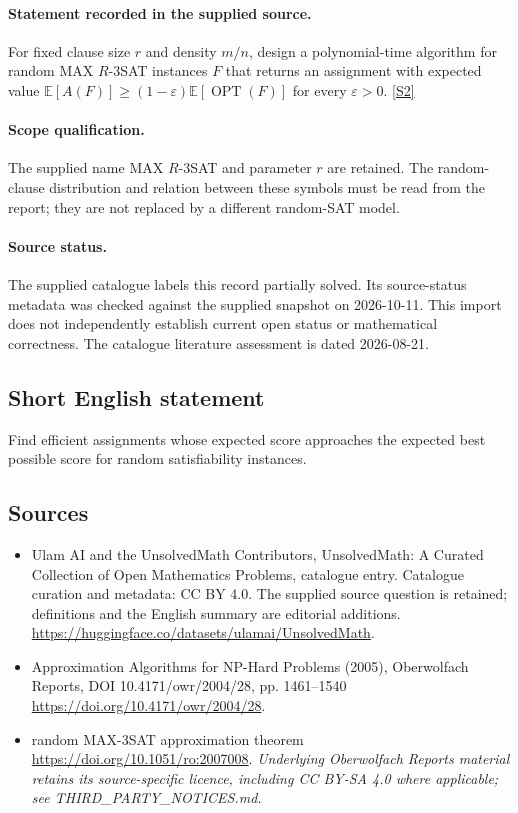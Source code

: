 \documentclass[11pt]{article}
\begin{document}
\paragraph{Statement recorded in the supplied source.}
For fixed clause size $r$ and density $m/n$, design a polynomial-time algorithm for random MAX $R$-3SAT instances $F$ that returns an assignment with expected value $\mathbb{E}[A(F)]\geq(1-\varepsilon)\mathbb{E}[\operatorname{OPT}(F)]$ for every $\varepsilon>0$. \href{https://doi.org/10.4171/owr/2004/28}{[S2]}
\paragraph{Scope qualification.}
The supplied name MAX $R$-3SAT and parameter $r$ are retained. The random-clause distribution and relation between these symbols must be read from the report; they are not replaced by a different random-SAT model.
\paragraph{Source status.}
The supplied catalogue labels this record partially solved. Its source-status metadata was checked against the supplied snapshot on 2026-10-11. This import does not independently establish current open status or mathematical correctness. The catalogue literature assessment is dated 2026-08-21.
\subsection{Short English statement}
Find efficient assignments whose expected score approaches the expected best possible score for random satisfiability instances.
\subsection{Sources}
\begin{itemize}
\item[S1] Ulam AI and the UnsolvedMath Contributors, UnsolvedMath: A Curated Collection of Open Mathematics Problems, catalogue entry. Catalogue curation and metadata: CC BY 4.0. The supplied source question is retained; definitions and the English summary are editorial additions.
\url{https://huggingface.co/datasets/ulamai/UnsolvedMath}.
\item[S2] Approximation Algorithms for NP-Hard Problems (2005), Oberwolfach Reports, DOI 10.4171/owr/2004/28, pp. 1461--1540
\url{https://doi.org/10.4171/owr/2004/28}.
\item[S3] random MAX-3SAT approximation theorem
\url{https://doi.org/10.1051/ro:2007008}.
\textit{Underlying Oberwolfach Reports material retains its source-specific licence, including CC BY-SA 4.0 where applicable; see THIRD\_PARTY\_NOTICES.md.}
\end{itemize}
\end{document}
